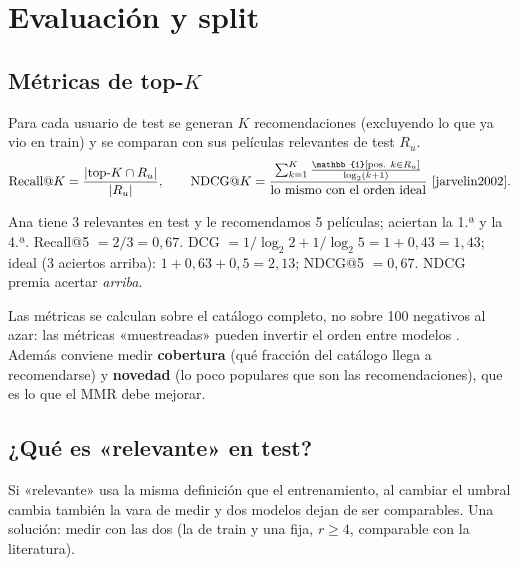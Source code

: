 \documentclass[a4paper,11pt]{article}
\begin{document}
\section{Evaluación y split}\label{sec:split}

\subsection{Métricas de top-$K$}
Para cada usuario de test se generan $K$ recomendaciones (excluyendo lo que ya vio en train) y se comparan con sus
películas relevantes de test $R_u$.
\[
\text{Recall@}K=\frac{|\text{top-}K\cap R_u|}{|R_u|},\qquad
\text{NDCG@}K=\frac{\sum_{k=1}^{K}\frac{\mathbb{1}[\text{pos. }k\in R_u]}{\log_2(k+1)}}{\text{lo mismo con el orden ideal}}
\ \text{\cite{jarvelin2002}}.
\]
\begin{ejemplo}
Ana tiene 3 relevantes en test y le recomendamos 5 películas; aciertan la 1.ª y la 4.ª.
Recall@5 $=2/3=0{,}67$. DCG $=1/\log_2 2+1/\log_2 5=1+0{,}43=1{,}43$; ideal (3 aciertos arriba):
$1+0{,}63+0{,}5=2{,}13$; NDCG@5 $=0{,}67$. NDCG premia acertar \emph{arriba}.
\end{ejemplo}
Las métricas se calculan sobre el catálogo completo, no sobre 100 negativos al azar: las métricas «muestreadas» pueden
invertir el orden entre modelos \cite{krichene2020}. Además conviene medir \textbf{cobertura} (qué fracción del catálogo
llega a recomendarse) y \textbf{novedad} (lo poco populares que son las recomendaciones), que es lo que el MMR debe mejorar.

\subsection{¿Qué es «relevante» en test?}
Si «relevante» usa la misma definición que el entrenamiento, al cambiar el umbral cambia también la vara de medir y dos
modelos dejan de ser comparables. Una solución: medir con las dos (la de train y una fija, $r\ge4$, comparable con la
literatura).
\end{document}
